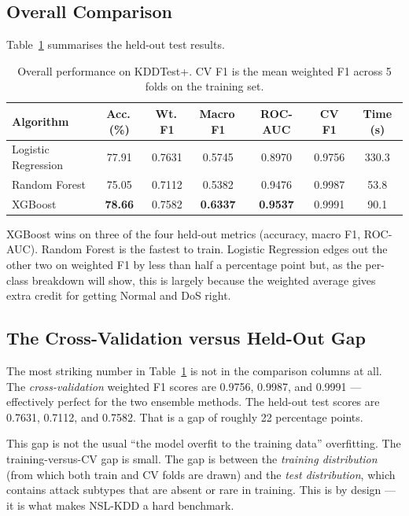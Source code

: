 \documentclass[11pt, a4paper]{article}
\begin{document}
\subsection{Overall Comparison}
Table~\ref{tab:overall} summarises the held-out test results.

\begin{table}[H]
\centering
\caption{Overall performance on KDDTest+. CV F1 is the mean weighted F1 across 5 folds on the training set.}
\label{tab:overall}
\begin{tabular}{lcccccc}
\toprule
Algorithm & Acc.\,(\%) & Wt.\,F1 & Macro\,F1 & ROC-AUC & CV F1 & Time (s) \\
\midrule
Logistic Regression & 77.91 & 0.7631 & 0.5745 & 0.8970 & 0.9756 & 330.3 \\
Random Forest       & 75.05 & 0.7112 & 0.5382 & 0.9476 & 0.9987 & 53.8 \\
XGBoost             & \textbf{78.66} & 0.7582 & \textbf{0.6337} & \textbf{0.9537} & 0.9991 & 90.1 \\
\bottomrule
\end{tabular}
\end{table}

XGBoost wins on three of the four held-out metrics (accuracy, macro F1, ROC-AUC). Random Forest is the fastest to train. Logistic Regression edges out the other two on weighted F1 by less than half a percentage point but, as the per-class breakdown will show, this is largely because the weighted average gives extra credit for getting Normal and DoS right.

\subsection{The Cross-Validation versus Held-Out Gap}
The most striking number in Table~\ref{tab:overall} is not in the comparison columns at all. The \emph{cross-validation} weighted F1 scores are 0.9756, 0.9987, and 0.9991 --- effectively perfect for the two ensemble methods. The held-out test scores are 0.7631, 0.7112, and 0.7582. That is a gap of roughly 22 percentage points.

This gap is not the usual ``the model overfit to the training data'' overfitting. The training-versus-CV gap is small. The gap is between the \emph{training distribution} (from which both train and CV folds are drawn) and the \emph{test distribution}, which contains attack subtypes that are absent or rare in training. This is by design --- it is what makes NSL-KDD a hard benchmark.
\end{document}
